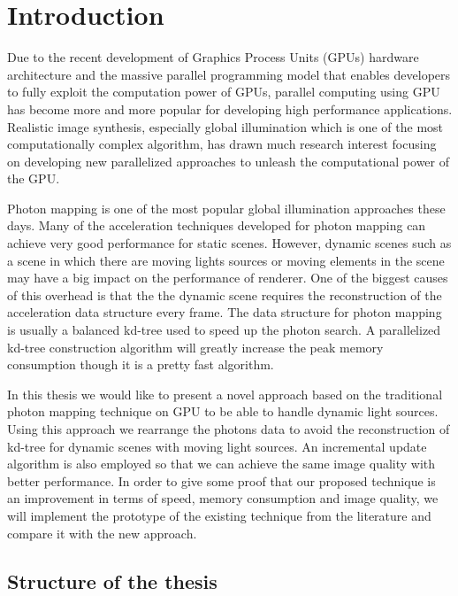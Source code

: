 \chapter{Introduction}

Due to the recent development of Graphics Process Units (GPUs) hardware architecture and the massive parallel programming model that enables developers to fully exploit the computation power of GPUs, parallel computing using GPU has become more and more popular for developing high performance applications. Realistic image synthesis, especially global illumination which is one of the most computationally complex algorithm, has drawn much research interest focusing on developing new parallelized approaches to unleash the computational power of the GPU. 

Photon mapping is one of the most popular global illumination approaches these days. Many of the acceleration techniques developed for photon mapping can achieve very good performance for static scenes. However, dynamic scenes such as a scene in which there are moving lights sources or moving elements in the scene may have a big impact on the performance of renderer. One of the biggest causes of this overhead is that the the dynamic scene requires the reconstruction of the acceleration data structure every frame. The data structure for photon mapping is usually a balanced kd-tree \cite{Bentley:1975:MBS:361002.361007} used to speed up the photon search. A parallelized kd-tree construction algorithm will greatly increase the peak memory consumption though it is a pretty fast algorithm.


In this thesis we would like to present a novel approach based on the traditional photon mapping technique on GPU to be able to handle dynamic light sources.  Using this approach we rearrange the photons data to avoid the reconstruction of kd-tree for dynamic scenes with moving light sources. An incremental update algorithm is also employed so that we can achieve the same image quality with better performance. 
In order to give some proof that our proposed technique is an improvement in terms of speed, memory consumption and image quality, we will implement the prototype of the existing technique from the literature and compare it with the new approach.

\section{Structure of the thesis}

